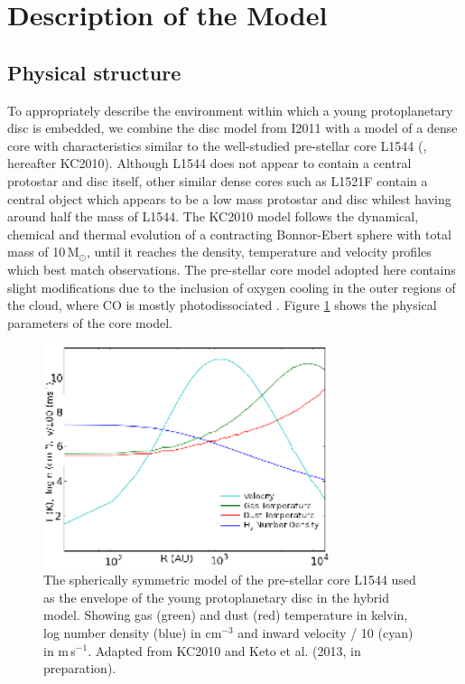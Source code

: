 \documentclass[useAMS,usenatbib]{mn2e}
\begin{document}
\section{Description of the Model} \label{sec:description_model}

\subsection{Physical structure} \label{subsec:physical_structure}

To appropriately describe the environment within which a young protoplanetary disc is embedded, we combine the disc model from I2011 with a model of a dense core with characteristics similar to the well-studied pre-stellar core L1544 (\citealt{Keto2010}, hereafter KC2010). Although L1544 does not appear to contain a central protostar and disc itself, other similar dense cores such as L1521F contain a central object which appears to be a low mass protostar and disc \citep{Bourke2006} whilest having around half the mass of L1544. The KC2010 model follows the dynamical, chemical and thermal evolution of a contracting Bonnor-Ebert sphere \citep{Bonnor1956,Ebert1957} with total mass of 10\,M$_{\odot}$, until it reaches the density, temperature and velocity profiles which best match observations. The pre-stellar core model adopted here contains slight modifications due to the inclusion of oxygen cooling in the outer regions of the cloud, where CO is mostly photodissociated \citep{Caselli2012}. Figure \ref{fig:l1544_model} shows the physical parameters of the core model. \smallskip

\begin{figure}
 \includegraphics[width=84mm]{Figures/model/L1544model_used_legend_small.eps}
 \caption{The spherically symmetric model of the pre-stellar core L1544 used as the envelope of the young protoplanetary disc in the hybrid model. Showing gas (green) and dust (red) temperature in kelvin, log number density (blue) in cm$^{-3}$ and inward velocity / 10 (cyan) in m$\,$s$^{-1}$. Adapted from KC2010 and Keto et al. (2013, in preparation).}
 \label{fig:l1544_model}
\end{figure}
\end{document}
